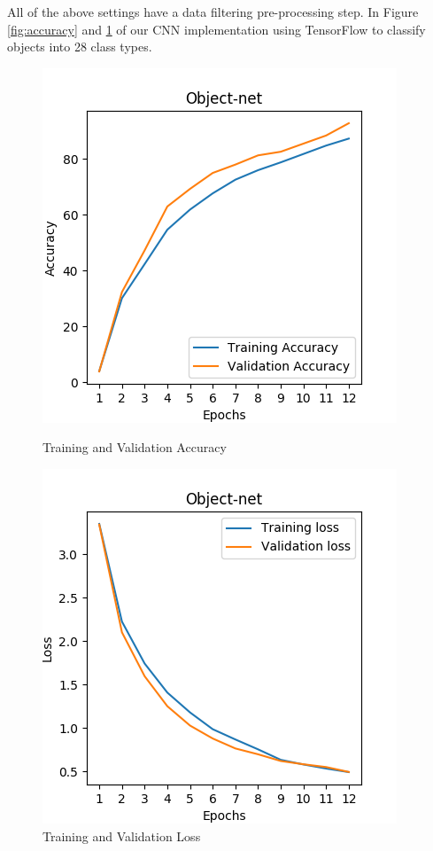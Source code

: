 All of the above settings have a data filtering pre-processing step. In Figure \ref{fig:accuracy} and \ref{fig:loss} of our CNN implementation using TensorFlow to classify objects into 28 class types. 


\begin{figure}[!h]
\centering
\begin{minipage}{0.4\textwidth}
  \centering
        \includegraphics[width=0.8\linewidth]{images/accuracy.png}
        \caption{Training and Validation Accuracy}
        \label{fig:accuracy}
\end{minipage}%
\begin{minipage}{0.4\textwidth}
  \centering
        \includegraphics[width=0.8\linewidth]{images/loss.png}
        \caption{Training and Validation Loss}
        \label{fig:loss}
\end{minipage}%
\end{figure}




